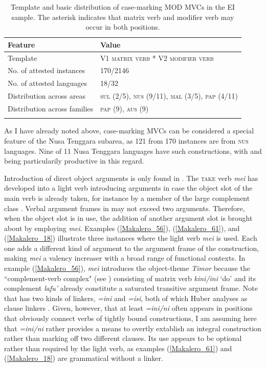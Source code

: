 \begin{table}
\begin{tabular}{ll}
\lsptoprule
Feature&Value\tabularnewline
\midrule
Template&V1 \textsc{matrix verb} * V2 \textsc{modifier verb}\tabularnewline
No. of attested instances& 170/2146 \tabularnewline
No. of attested languages& 18/32 \tabularnewline
Distribution across areas& \textsc{sul} (2/5), \textsc{nus} (9/11), \textsc{mal} (3/5), \textsc{pap} (4/11) \tabularnewline
Distribution across families& \textsc{pap} (9), \textsc{aus} (9) \tabularnewline
\lspbottomrule
\end{tabular}
\caption[Template and basic distribution of case-marking MOD MVCs]{Template and basic distribution of case-marking MOD MVCs in the EI sample. The asterisk indicates that matrix verb and modifier verb may occur in both positions.}
\label{table:case}
\end{table}

As I have already noted above, case-marking MVCs can be considered a special feature of the Nusa Tenggara subarea, as 121 from 170 instances are from \textsc{nus} languages. Nine of 11 Nusa Tenggara languages have such constructions, with  and  being particularily productive in this regard.

Introduction of direct object arguments is only found in . The \textsc{take} verb \textit{mei} has developed into a light verb introducing arguments in case the object slot of the main verb is already taken, for instance by a member of the large complement class \citep[203f.]{huber2011}. Verbal argument frames in  may not exceed two arguments. Therefore, when the object slot is in use, the addition of another argument slot is brought about by employing \textit{mei}. Examples (\ref{Makalero_56}), (\ref{Makalero_61}), and (\ref{Makalero_18}) illustrate three instances where the light verb \textit{mei} is used. Each one adds a different kind of argument to the argument frame of the construction, making \textit{mei} a valency increaser with a broad range of functional contexts. In example (\ref{Makalero_56}), \textit{mei} introduces the object-theme \textit{Timor} because the ``complement-verb complex" (see \citealt[131f.]{huber2011}) consisting of matrix verb \textit{kini/ini} `do' and its complement \textit{lafu'} already constitute a saturated transitive argument frame. Note that  has two kinds of linkers, \textit{=ini} and \textit{=isi}, both of which Huber analyses as clause linkers \citep[457f.]{huber2011}. Given, however, that at least \textit{=ini/ni} often appears in positions that obviously connect verbs of tightly bound constructions, I am assuming here that \textit{=ini/ni} rather provides a means to overtly extablish an integral construction rather than marking off two different clauses. Its use appears to be optional rather than required by the light verb, as examples (\ref{Makalero_61}) and (\ref{Makalero_18}) are grammatical without a linker.

